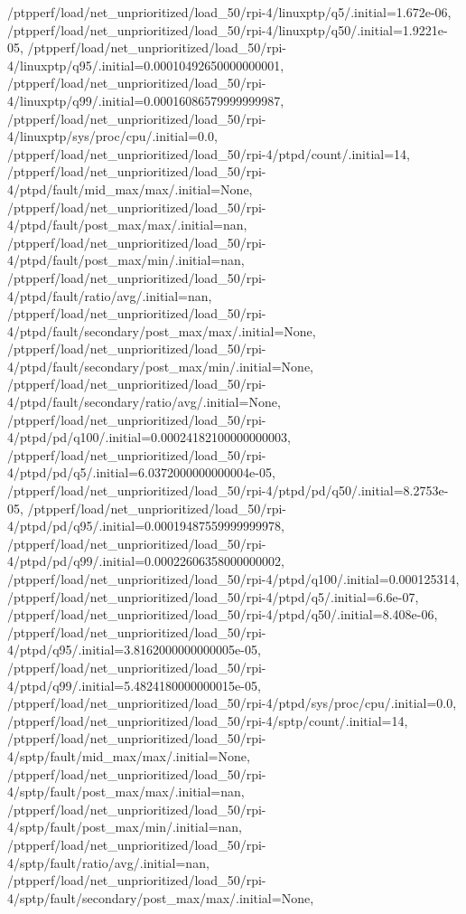 {    /ptpperf/load/net_unprioritized/load_50/rpi-4/linuxptp/q5/.initial=1.672e-06,
    /ptpperf/load/net_unprioritized/load_50/rpi-4/linuxptp/q50/.initial=1.9221e-05,
    /ptpperf/load/net_unprioritized/load_50/rpi-4/linuxptp/q95/.initial=0.00010492650000000001,
    /ptpperf/load/net_unprioritized/load_50/rpi-4/linuxptp/q99/.initial=0.00016086579999999987,
    /ptpperf/load/net_unprioritized/load_50/rpi-4/linuxptp/sys/proc/cpu/.initial=0.0,
    /ptpperf/load/net_unprioritized/load_50/rpi-4/ptpd/count/.initial=14,
    /ptpperf/load/net_unprioritized/load_50/rpi-4/ptpd/fault/mid_max/max/.initial=None,
    /ptpperf/load/net_unprioritized/load_50/rpi-4/ptpd/fault/post_max/max/.initial=nan,
    /ptpperf/load/net_unprioritized/load_50/rpi-4/ptpd/fault/post_max/min/.initial=nan,
    /ptpperf/load/net_unprioritized/load_50/rpi-4/ptpd/fault/ratio/avg/.initial=nan,
    /ptpperf/load/net_unprioritized/load_50/rpi-4/ptpd/fault/secondary/post_max/max/.initial=None,
    /ptpperf/load/net_unprioritized/load_50/rpi-4/ptpd/fault/secondary/post_max/min/.initial=None,
    /ptpperf/load/net_unprioritized/load_50/rpi-4/ptpd/fault/secondary/ratio/avg/.initial=None,
    /ptpperf/load/net_unprioritized/load_50/rpi-4/ptpd/pd/q100/.initial=0.00024182100000000003,
    /ptpperf/load/net_unprioritized/load_50/rpi-4/ptpd/pd/q5/.initial=6.0372000000000004e-05,
    /ptpperf/load/net_unprioritized/load_50/rpi-4/ptpd/pd/q50/.initial=8.2753e-05,
    /ptpperf/load/net_unprioritized/load_50/rpi-4/ptpd/pd/q95/.initial=0.00019487559999999978,
    /ptpperf/load/net_unprioritized/load_50/rpi-4/ptpd/pd/q99/.initial=0.00022606358000000002,
    /ptpperf/load/net_unprioritized/load_50/rpi-4/ptpd/q100/.initial=0.000125314,
    /ptpperf/load/net_unprioritized/load_50/rpi-4/ptpd/q5/.initial=6.6e-07,
    /ptpperf/load/net_unprioritized/load_50/rpi-4/ptpd/q50/.initial=8.408e-06,
    /ptpperf/load/net_unprioritized/load_50/rpi-4/ptpd/q95/.initial=3.8162000000000005e-05,
    /ptpperf/load/net_unprioritized/load_50/rpi-4/ptpd/q99/.initial=5.4824180000000015e-05,
    /ptpperf/load/net_unprioritized/load_50/rpi-4/ptpd/sys/proc/cpu/.initial=0.0,
    /ptpperf/load/net_unprioritized/load_50/rpi-4/sptp/count/.initial=14,
    /ptpperf/load/net_unprioritized/load_50/rpi-4/sptp/fault/mid_max/max/.initial=None,
    /ptpperf/load/net_unprioritized/load_50/rpi-4/sptp/fault/post_max/max/.initial=nan,
    /ptpperf/load/net_unprioritized/load_50/rpi-4/sptp/fault/post_max/min/.initial=nan,
    /ptpperf/load/net_unprioritized/load_50/rpi-4/sptp/fault/ratio/avg/.initial=nan,
    /ptpperf/load/net_unprioritized/load_50/rpi-4/sptp/fault/secondary/post_max/max/.initial=None,
}
